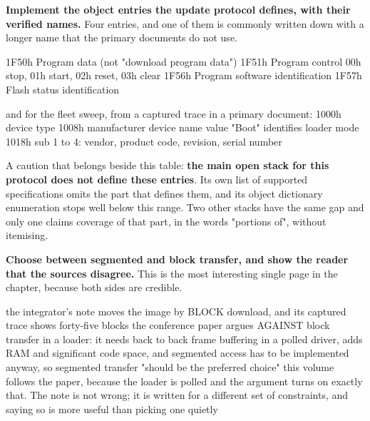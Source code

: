 \begin{steps}
\item \textbf{Implement the object entries the update protocol defines, with
their verified names.} Four entries, and one of them is commonly written down
with a longer name that the primary documents do not use.
\begin{plaincode}
1F50h   Program data                    (not "download program data")
1F51h   Program control  00h stop, 01h start, 02h reset, 03h clear
1F56h   Program software identification
1F57h   Flash status identification

and for the fleet sweep, from a captured trace in a primary document:
1000h   device type
1008h   manufacturer device name        value "Boot" identifies loader mode
1018h   sub 1 to 4: vendor, product code, revision, serial number
\end{plaincode}
A caution that belongs beside this table: \textbf{the main open stack for this
protocol does not define these entries}. Its own list of supported
specifications omits the part that defines them, and its object dictionary
enumeration stops well below this range. Two other stacks have the same gap and
only one claims coverage of that part, in the words "portions of", without
itemising.

\item \textbf{Choose between segmented and block transfer, and show the reader
that the sources disagree.} This is the most interesting single page in the
chapter, because both sides are credible.
\begin{plaincode}
the integrator's note  moves the image by BLOCK download, and its captured
                       trace shows forty-five blocks
the conference paper   argues AGAINST block transfer in a loader: it needs
                       back to back frame buffering in a polled driver, adds
                       RAM and significant code space, and segmented access
                       has to be implemented anyway, so segmented transfer
                       "should be the preferred choice"
this volume            follows the paper, because the loader is polled and
                       the argument turns on exactly that. The note is not
                       wrong; it is written for a different set of
                       constraints, and saying so is more useful than
                       picking one quietly
\end{plaincode}


\end{steps}

